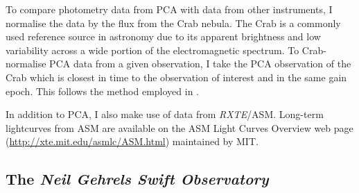 \par To compare photometry data from PCA with data from other instruments, I normalise the data by the flux from the Crab nebula.  The Crab is a commonly used reference source in astronomy due to its apparent brightness and low variability across a wide portion of the electromagnetic spectrum.  To Crab-normalise PCA data from a given observation, I take the PCA observation of the Crab which is closest in time to the observation of interest and in the same gain epoch.  This follows the method employed in \citet{Altamirano_CrabNorm}.
\par In addition to PCA, I also make use of data from \textit{RXTE}/ASM.  Long-term lightcurves from ASM are available on the ASM Light Curves Overview web page (\url{http://xte.mit.edu/asmlc/ASM.html}) maintained by MIT.

\subsection{The \textit{Neil Gehrels Swift Observatory}}

